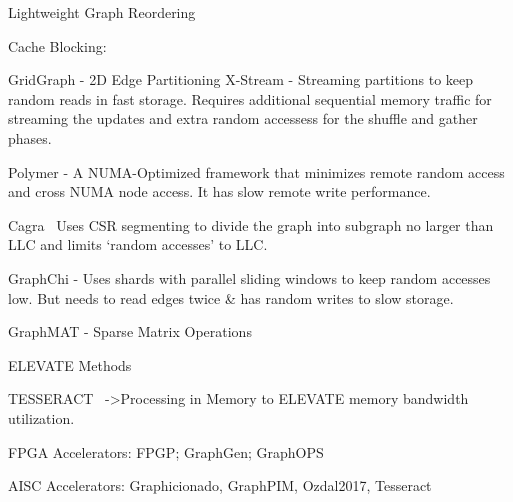 Lightweight Graph Reordering ~\cite{Balaji2018}

Cache Blocking: 

GridGraph - 2D Edge Partitioning
X-Stream - Streaming partitions to keep random reads in fast storage. Requires additional sequential memory traffic for streaming the updates and extra random accessess for the shuffle and gather phases. 

Polymer - A NUMA-Optimized framework that minimizes remote random access and cross NUMA node access. It has slow remote write performance. 

Cagra~\cite{Zhang2017} Uses CSR segmenting to divide the graph into subgraph no larger than LLC and limits `random accesses' to LLC.

GraphChi - Uses shards with parallel sliding windows to keep random accesses low. But needs to read edges twice & has random writes to slow storage. 

GraphMAT - Sparse Matrix Operations

ELEVATE Methods

TESSERACT~\cite{Ahn2015} ->Processing in Memory to ELEVATE memory bandwidth utilization.

FPGA Accelerators: FPGP; GraphGen; GraphOPS

AISC Accelerators: Graphicionado, GraphPIM, Ozdal2017, Tesseract

